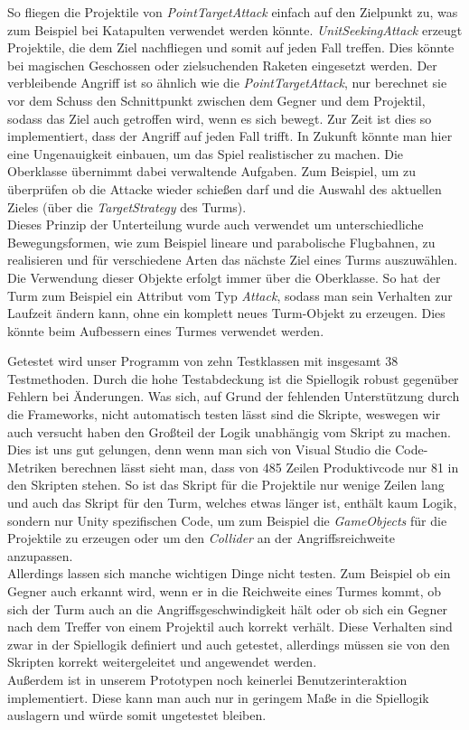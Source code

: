 So fliegen die Projektile von \textit{PointTargetAttack} einfach auf den Zielpunkt zu, was zum Beispiel bei Katapulten verwendet werden könnte. \textit{UnitSeekingAttack} erzeugt Projektile, die dem Ziel nachfliegen und somit auf jeden Fall treffen. Dies könnte bei magischen Geschossen oder zielsuchenden Raketen eingesetzt werden. Der verbleibende Angriff ist so ähnlich wie die \textit{PointTargetAttack}, nur  berechnet sie vor dem Schuss den Schnittpunkt zwischen dem Gegner und dem Projektil, sodass das Ziel auch getroffen wird, wenn es sich bewegt. Zur Zeit ist dies so implementiert, dass der Angriff auf jeden Fall trifft. In Zukunft könnte man hier eine Ungenauigkeit einbauen, um das Spiel realistischer zu machen. Die Oberklasse übernimmt dabei verwaltende Aufgaben. Zum Beispiel, um zu überprüfen ob die Attacke wieder schießen darf und die Auswahl des aktuellen Zieles (über die \textit{TargetStrategy} des Turms).\\
Dieses Prinzip der Unterteilung wurde auch verwendet um unterschiedliche Bewegungsformen, wie zum Beispiel lineare und parabolische Flugbahnen, zu realisieren und für verschiedene Arten das nächste Ziel eines Turms auszuwählen. Die Verwendung dieser Objekte erfolgt immer über die Oberklasse. So hat der Turm zum Beispiel ein Attribut vom Typ \textit{Attack}, sodass man sein Verhalten zur Laufzeit ändern kann, ohne ein komplett neues Turm-Objekt zu erzeugen. Dies könnte beim Aufbessern eines Turmes verwendet werden.

Getestet wird unser Programm von zehn Testklassen mit insgesamt 38 Testmethoden. Durch die hohe Testabdeckung ist die Spiellogik robust gegenüber Fehlern bei Änderungen. Was sich, auf Grund der fehlenden Unterstützung durch die Frameworks, nicht automatisch testen lässt sind die Skripte, weswegen wir auch versucht haben den Großteil der Logik unabhängig vom Skript zu machen. Dies ist uns gut gelungen, denn wenn man sich von Visual Studio die Code-Metriken berechnen lässt sieht man, dass von 485 Zeilen Produktivcode nur 81 in den Skripten stehen. So ist das Skript für die Projektile nur wenige Zeilen lang und auch das Skript für den Turm, welches etwas länger ist, enthält kaum Logik, sondern nur Unity spezifischen Code, um zum Beispiel die \textit{GameObjects} für die Projektile zu erzeugen oder um den \textit{Collider} an der Angriffsreichweite anzupassen.\\
Allerdings lassen sich manche wichtigen Dinge nicht testen. Zum Beispiel ob ein Gegner auch erkannt wird, wenn er in die Reichweite eines Turmes kommt, ob sich der Turm auch an die Angriffsgeschwindigkeit hält oder ob sich ein Gegner nach dem Treffer von einem Projektil auch korrekt verhält. Diese Verhalten sind zwar in der Spiellogik definiert und auch getestet, allerdings müssen sie von den Skripten korrekt weitergeleitet und angewendet werden.\\
Außerdem ist in unserem Prototypen noch keinerlei Benutzerinteraktion implementiert. Diese kann man auch nur in geringem Maße in die Spiellogik auslagern und würde somit ungetestet bleiben.

